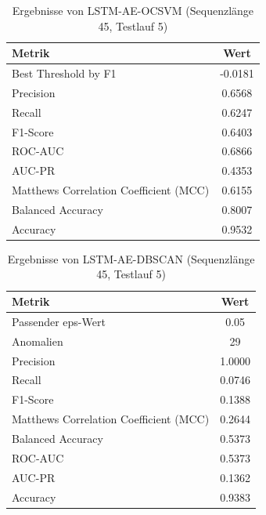 \documentclass[a4paper,12pt]{article}
\begin{document}
\begin{table}[H]
	\centering
	\caption{Ergebnisse von LSTM-AE-OCSVM (Sequenzlänge 45, Testlauf 5)}
	\begin{tabular}{lc}
		\hline
		Metrik & Wert \\
		\hline
		Best Threshold by F1 & -0.0181 \\
		Precision & 0.6568 \\
		Recall & 0.6247 \\
		F1-Score & 0.6403 \\
		ROC-AUC & 0.6866 \\
		AUC-PR & 0.4353 \\
		Matthews Correlation Coefficient (MCC) & 0.6155 \\
		Balanced Accuracy & 0.8007 \\
		Accuracy & 0.9532 \\
		\hline
	\end{tabular}
\end{table}

\begin{table}[H]
	\centering
	\caption{Ergebnisse von LSTM-AE-DBSCAN (Sequenzlänge 45, Testlauf 5)}
	\begin{tabular}{lc}
		\hline
		Metrik & Wert \\
		\hline
		Passender eps-Wert & 0.05 \\
		Anomalien & 29 \\
		Precision & 1.0000 \\
		Recall & 0.0746 \\
		F1-Score & 0.1388 \\
		Matthews Correlation Coefficient (MCC) & 0.2644 \\
		Balanced Accuracy & 0.5373 \\
		ROC-AUC & 0.5373 \\
		AUC-PR & 0.1362 \\
		Accuracy & 0.9383 \\
		\hline
	\end{tabular}
\end{table}

\newpage	
\end{document}
